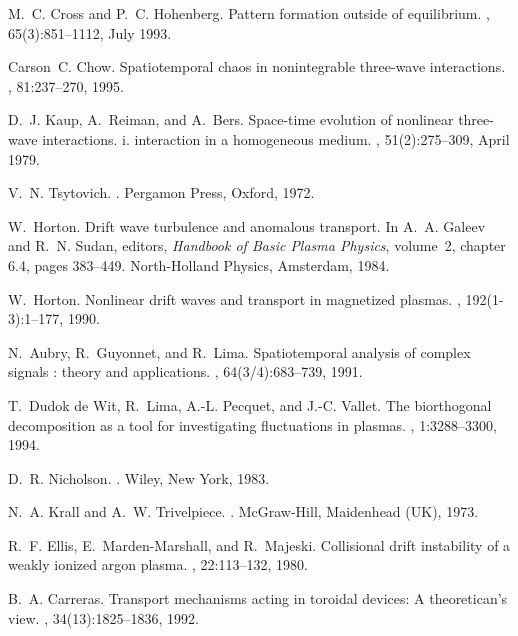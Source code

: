 \begin{thebibliography}{10}

M.~C. Cross and P.~C. Hohenberg.
\newblock Pattern formation outside of equilibrium.
, 65(3):851--1112, July 1993.

Carson~C. Chow.
\newblock Spatiotemporal chaos in nonintegrable three-wave interactions.
, 81:237--270, 1995.

D.~J. Kaup, A.~Reiman, and A.~Bers.
\newblock Space-time evolution of nonlinear three-wave interactions. i.
  interaction in a homogeneous medium.
, 51(2):275--309, April 1979.

V.~N. Tsytovich.
.
\newblock Pergamon Press, Oxford, 1972.

W.~Horton.
\newblock Drift wave turbulence and anomalous transport.
\newblock In A.~A. Galeev and R.~N. Sudan, editors, {\em Handbook of Basic
  Plasma Physics}, volume~2, chapter 6.4, pages 383--449. North-Holland
  Physics, Amsterdam, 1984.

W.~Horton.
\newblock Nonlinear drift waves and transport in magnetized plasmas.
, 192(1-3):1--177, 1990.

N.~Aubry, R.~Guyonnet, and R.~Lima.
\newblock Spatiotemporal analysis of complex signals : theory and applications.
, 64(3/4):683--739, 1991.

T.~{Dudok de Wit}, R.~Lima, A.-L. Pecquet, and J.-C. Vallet.
\newblock The biorthogonal decomposition as a tool for investigating
  fluctuations in plasmas.
, 1:3288--3300, 1994.

D.~R. Nicholson.
.
\newblock Wiley, New York, 1983.

N.~A. Krall and A.~W. Trivelpiece.
.
\newblock McGraw-Hill, Maidenhead (UK), 1973.

R.~F. Ellis, E.~Marden-Marshall, and R.~Majeski.
\newblock Collisional drift instability of a weakly ionized argon plasma.
, 22:113--132, 1980.

B.~A. Carreras.
\newblock Transport mechanisms acting in toroidal devices: A theoretican's
  view.
, 34(13):1825--1836, 1992.


\end{thebibliography}
